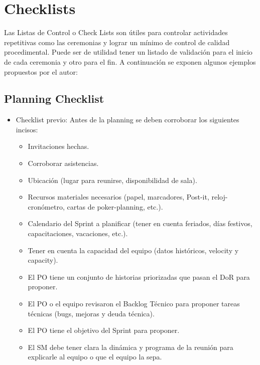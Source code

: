 \newpage
\section{Checklists}

Las Listas de Control o Check Lists son útiles para controlar actividades repetitivas como las ceremonias y lograr un mínimo de control de calidad procedimental. Puede ser de utilidad tener un listado de validación para el inicio de cada ceremonia y otro para el fin. 
A continuación se exponen algunos ejemplos propuestos por el autor:

\subsection{Planning Checklist}

\begin{itemize}
  
  \item {Checklist previo: Antes de la planning se deben corroborar los siguientes incisos:
  
  \begin{itemize}
    \item Invitaciones hechas.
    \item Corroborar asistencias.
    \item Ubicación (lugar para reunirse, disponibilidad de sala).
    \item Recursos materiales necesarios (papel, marcadores, Post-it, reloj-cronómetro, cartas de poker-planning, etc.).
    \item Calendario del Sprint a planificar (tener en cuenta feriados, días festivos, capacitaciones, vacaciones, etc.).
    \item Tener en cuenta la capacidad del equipo (datos históricos, velocity y capacity).
    \item El PO tiene un conjunto de historias priorizadas que pasan el DoR para proponer.
    \item El PO o el equipo revisaron el Backlog Técnico para proponer tareas técnicas (bugs, mejoras y deuda técnica).
    \item El PO tiene el objetivo del Sprint para proponer.
    \item El SM debe tener clara la dinámica y programa de la reunión para explicarle al equipo o que el equipo la sepa.
  \end{itemize}
  }
  

\end{itemize}
